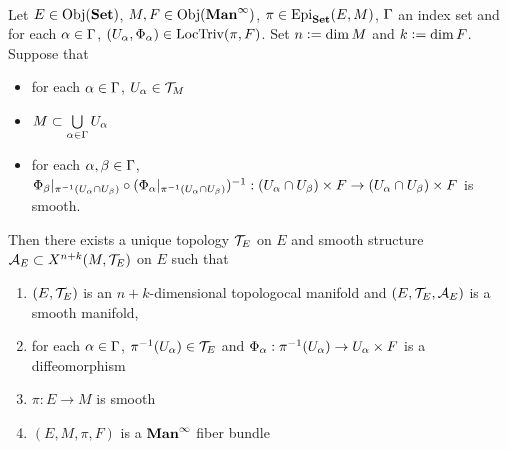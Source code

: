 \documentclass{book}
\begin{document}
	\begin{ex}   \\
		Let $E \in \operatorname{Obj}(\text{\textbf{Set}})$, $M, F \in \operatorname{Obj}(\operatorname*{\text{\textbf{Man}}^{\infty}})$, $\pi \in \operatorname{Epi}_{\text{\textbf{Set}}}(E, M)$, $\Gamma$ an index set and for each $\alpha \in \Gamma$, $(U_{\alpha}, \Phi_{\alpha}) \in \text{LocTriv}(\pi, F)$. Set $n \vcentcolon= \dim M$ and $k \vcentcolon= \dim F$. Suppose that 
		\begin{itemize}
			\item for each $\alpha \in \Gamma$, $U_{\alpha} \in \mathcal{T}_M$
			\item $M \subset \bigcup\limits_{\alpha \in \Gamma} U_{\alpha}$ 
			\item for each $\alpha,\beta \in \Gamma$, $\Phi_{\beta}|_{\pi^{-1}(U_{\alpha} \cap U_{\beta})} \circ (\Phi_{\alpha}|_{\pi^{-1}(U_{\alpha} \cap U_{\beta})})^{-1}: (U_{\alpha} \cap U_{\beta}) \times F \rightarrow  (U_{\alpha} \cap U_{\beta}) \times F$ is smooth.
		\end{itemize}
		Then there exists a unique topology $\mathcal{T}_E$ on $E$ and smooth structure $\mathcal{A}_E \subset X^{n+k}(M, \mathcal{T}_E)$ on $E$ such that
		\begin{enumerate}
			\item $(E, \mathcal{T}_E)$ is an $n+k$-dimensional topologocal manifold and $(E, \mathcal{T}_E, \mathcal{A}_E)$ is a smooth manifold,
			\item for each $\alpha \in \Gamma$, $ \pi^{-1}(U_{\alpha}) \in \mathcal{T}_E$ and $\Phi_{\alpha}: \pi^{-1}(U_{\alpha}) \rightarrow U_{\alpha} \times F$ is a diffeomorphism
			\item $\pi: E \rightarrow M$ is smooth
			\item $(E, M, \pi, F)$ is a $\operatorname*{\text{\textbf{Man}}^{\infty}}$ fiber bundle
		\end{enumerate}
	\end{ex}
\end{document}
